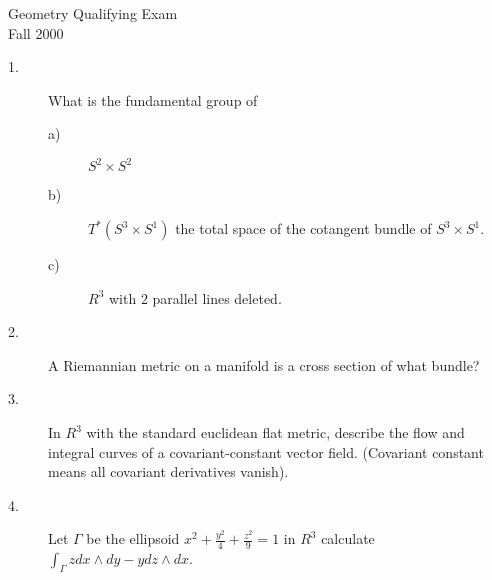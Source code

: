 \documentclass[12pt,bbb]{report}
\begin{document}


\begin{center} Geometry Qualifying Exam \\
               Fall 2000  \end{center}




\begin{description}

\item[1.] What is the fundamental group of

\begin{description}

\item[a)] $S^2 \times S^2$

\item[b)] $T^\ast (S^3 \times S^1)$  the total space of the cotangent
bundle of  $S^3 \times S^1$.

\item[c)] $R^3$  with  $2$  parallel lines deleted.

\end{description}


\item[2.] A Riemannian metric on a manifold is a cross section of what
bundle?


\item[3.] In  $R^3$  with the standard euclidean flat metric, describe
the flow and integral curves of a covariant-constant vector field.
(Covariant constant means all covariant derivatives vanish).


\item[4.] Let  $\Gamma$  be the ellipsoid  $x^2 + \frac {y^2}4 + \frac
{z^2}9 = 1$  in  $R^3$  calculate  $\int_\Gamma zdx\wedge dy - ydz\wedge
dx$.



\end{description}
\end{document}
